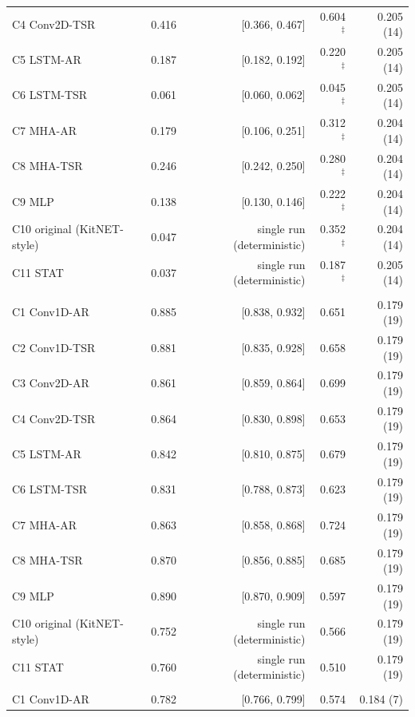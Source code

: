 \begin{longtable}{@{}lrrrr@{}}
\quad C4 Conv2D-TSR & 0.416 & [0.366, 0.467] & 0.604$^{\ddagger}$ & 0.205 (14) \\
\quad C5 LSTM-AR & 0.187 & [0.182, 0.192] & 0.220$^{\ddagger}$ & 0.205 (14) \\
\quad C6 LSTM-TSR & 0.061 & [0.060, 0.062] & 0.045$^{\ddagger}$ & 0.205 (14) \\
\quad C7 MHA-AR & 0.179 & [0.106, 0.251] & 0.312$^{\ddagger}$ & 0.204 (14) \\
\quad C8 MHA-TSR & 0.246 & [0.242, 0.250] & 0.280$^{\ddagger}$ & 0.204 (14) \\
\quad C9 MLP & 0.138 & [0.130, 0.146] & 0.222$^{\ddagger}$ & 0.204 (14) \\
\quad C10 original (KitNET-style) & 0.047 & single run (deterministic) & 0.352$^{\ddagger}$ & 0.204 (14) \\
\quad C11 STAT & 0.037 & single run (deterministic) & 0.187$^{\ddagger}$ & 0.205 (14) \\
\addlinespace
\multicolumn{5}{l}{\textit{CIC-IDS2017} --- $n=2$ seed(s); prevalence $p=0.236$; $F_{1,\mathrm{trivial}}=0.381$; AUC$_t=0.639$} \\
\quad C1 Conv1D-AR & 0.885 & [0.838, 0.932] & 0.651 & 0.179 (19) \\
\quad C2 Conv1D-TSR & 0.881 & [0.835, 0.928] & 0.658 & 0.179 (19) \\
\quad C3 Conv2D-AR & 0.861 & [0.859, 0.864] & 0.699 & 0.179 (19) \\
\quad C4 Conv2D-TSR & 0.864 & [0.830, 0.898] & 0.653 & 0.179 (19) \\
\quad C5 LSTM-AR & 0.842 & [0.810, 0.875] & 0.679 & 0.179 (19) \\
\quad C6 LSTM-TSR & 0.831 & [0.788, 0.873] & 0.623 & 0.179 (19) \\
\quad C7 MHA-AR & 0.863 & [0.858, 0.868] & 0.724 & 0.179 (19) \\
\quad C8 MHA-TSR & 0.870 & [0.856, 0.885] & 0.685 & 0.179 (19) \\
\quad C9 MLP & 0.890 & [0.870, 0.909] & 0.597 & 0.179 (19) \\
\quad C10 original (KitNET-style) & 0.752 & single run (deterministic) & 0.566 & 0.179 (19) \\
\quad C11 STAT & 0.760 & single run (deterministic) & 0.510 & 0.179 (19) \\
\addlinespace
\multicolumn{5}{l}{\textit{CSE-CIC-IDS2018} --- $n=2$ seed(s); prevalence $p=0.263$; $F_{1,\mathrm{trivial}}=0.416$; AUC$_t=0.391$} \\
\quad C1 Conv1D-AR & 0.782 & [0.766, 0.799] & 0.574 & 0.184 (7) \\

\end{longtable}
